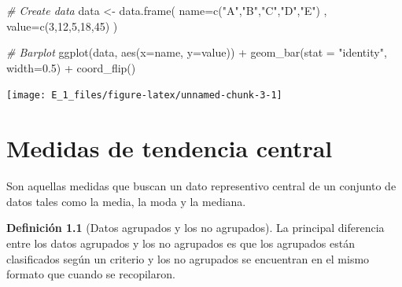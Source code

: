 \documentclass[
  11pt,
]{krantz}
\newenvironment{Shaded}{\begin{snugshade}}{\end{snugshade}}
\newcommand{\AttributeTok}[1]{\textcolor[rgb]{0.77,0.63,0.00}{#1}}
\newcommand{\CommentTok}[1]{\textcolor[rgb]{0.56,0.35,0.01}{\textit{#1}}}
\newcommand{\DecValTok}[1]{\textcolor[rgb]{0.00,0.00,0.81}{#1}}
\newcommand{\FloatTok}[1]{\textcolor[rgb]{0.00,0.00,0.81}{#1}}
\newcommand{\FunctionTok}[1]{\textcolor[rgb]{0.00,0.00,0.00}{#1}}
\newcommand{\NormalTok}[1]{#1}
\newcommand{\OtherTok}[1]{\textcolor[rgb]{0.56,0.35,0.01}{#1}}
\newcommand{\SpecialCharTok}[1]{\textcolor[rgb]{0.00,0.00,0.00}{#1}}
\newcommand{\StringTok}[1]{\textcolor[rgb]{0.31,0.60,0.02}{#1}}
\theoremstyle{definition}
\newtheorem{definition}{Definición}[chapter]
\theoremstyle{definition}
\theoremstyle{definition}
\theoremstyle{definition}
\theoremstyle{remark}
\begin{document}
\begin{Shaded}
\begin{Highlighting}[]
\CommentTok{\# Create data}
\NormalTok{data }\OtherTok{\textless{}{-}} \FunctionTok{data.frame}\NormalTok{(}
  \AttributeTok{name=}\FunctionTok{c}\NormalTok{(}\StringTok{"A"}\NormalTok{,}\StringTok{"B"}\NormalTok{,}\StringTok{"C"}\NormalTok{,}\StringTok{"D"}\NormalTok{,}\StringTok{"E"}\NormalTok{) ,  }
  \AttributeTok{value=}\FunctionTok{c}\NormalTok{(}\DecValTok{3}\NormalTok{,}\DecValTok{12}\NormalTok{,}\DecValTok{5}\NormalTok{,}\DecValTok{18}\NormalTok{,}\DecValTok{45}\NormalTok{)}
\NormalTok{  )}

\CommentTok{\# Barplot}
\FunctionTok{ggplot}\NormalTok{(data, }\FunctionTok{aes}\NormalTok{(}\AttributeTok{x=}\NormalTok{name, }\AttributeTok{y=}\NormalTok{value)) }\SpecialCharTok{+}
  \FunctionTok{geom\_bar}\NormalTok{(}\AttributeTok{stat =} \StringTok{"identity"}\NormalTok{, }\AttributeTok{width=}\FloatTok{0.5}\NormalTok{) }\SpecialCharTok{+}
  \FunctionTok{coord\_flip}\NormalTok{()}
\end{Highlighting}
\end{Shaded}

\begin{center}\texttt{[image: E\_1\_files/figure-latex/unnamed-chunk-3-1]} \end{center}

\hypertarget{medidas-de-tendencia-central}{%
\chapter{Medidas de tendencia central}\label{medidas-de-tendencia-central}}

Son aquellas medidas que buscan un dato representivo central de un conjunto de datos tales como la media, la moda y la mediana.

\begin{definition}[Datos agrupados y los no agrupados]
\protect\hypertarget{def:tabulacion}{}\label{def:tabulacion}La principal diferencia entre los datos agrupados y los no agrupados es que los agrupados están clasificados según un criterio y los no agrupados se encuentran en el mismo formato que cuando se recopilaron.
\end{definition}
\end{document}
